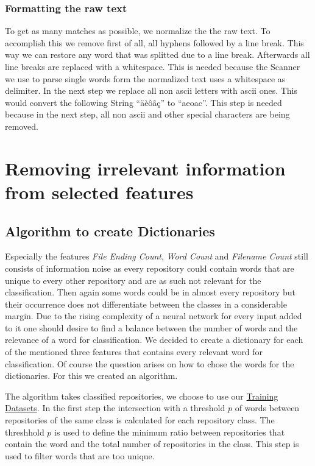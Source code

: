 \documentclass[paper=A4,pagesize=auto,11pt,headinclude=true,footinclude=true,BCOR=0mm,DIV=calc]{scrartcl}
\begin{document}
	
	
	\subsubsection{Formatting the raw text}
	To get as many matches as possible, we  normalize the the raw text. To    accomplish this we remove first of all, all hyphens followed by a line break. This way we can restore any word that was splitted due to a line break. Afterwards all line breaks are replaced with a whitespace. This is needed because the Scanner we use to parse single words form the normalized text uses a whitespace as delimiter. In the next step we replace all non ascii letters with ascii ones. This would convert the following String “äèôãç” to “aeoac”. This step is needed because in the next step, all non ascii and other special characters are being removed.
	
	
	\section{Removing irrelevant information from selected features}
	\label{sec: dictionary}
	\subsection{Algorithm to create Dictionaries}
	Especially the features \textit{File Ending Count}, \textit{Word Count} and\textit{ Filename Count} still consists of information noise as every repository could contain words that are unique to every other repository and are as such not relevant for the classification. Then again some words could be in almost every repository but their occurrence does not differentiate between the classes in a considerable margin. Due to the rising complexity of a neural network for every input added to it one should desire to find a balance between the number of words and the relevance of a word for classification. We decided to create a dictionary for each of the mentioned three features that contains every relevant word for classification.
	Of course the question arises on how to chose the words for the dictionaries. For this we created an algorithm.
	
	The algorithm takes classified repositories, we choose to use our \hyperref[src:Repositories]{Training Datasets}.
	In the first step the intersection with a threshold $p$ of words between repositories of the same class is calculated for each repository class. The threshhold $p$ is used to define the minimum ratio between repositories that contain the word and the total number of repositories in the class. 
	This step is used to filter words that are too unique.
	
\end{document}
